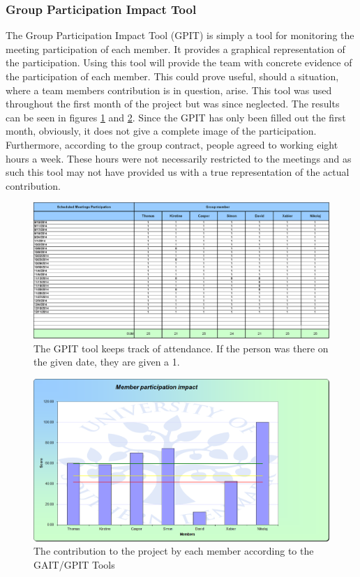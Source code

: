 \subsubsection{Group Participation Impact Tool}
The Group Participation Impact Tool (GPIT) is simply a tool for monitoring the meeting participation of each member. It provides a graphical representation of the participation. Using this tool will provide the team with concrete evidence of the participation of each member. This could prove useful, should a situation, where a team members contribution is in question, arise. This tool was used throughout the first month of the project but was since neglected. The results can be seen in figures \ref{fig:GPIT} and \ref{fig:GPITGraph}. Since the GPIT has only been filled out the first month, obviously, it does not give a complete image of the participation. Furthermore, according to the group contract, people agreed to working eight hours a week. These hours were not necessarily restricted to the meetings and as such this tool may not have provided us with a true representation of the actual contribution.


\begin{figure}[h!]
	\includegraphics[width=\textwidth]{./graphics/gpit_attendance}
	\caption[The GPIT tool]{The GPIT tool keeps track of attendance. If the person was there on the given date, they are given a 1.}
	\label{fig:GPIT}
\end{figure}

\begin{figure}[h!]
	\includegraphics[width=\textwidth]{./graphics/GPIT_impact}
	\caption[The contribution by each member]{The contribution to the project by each member according to the GAIT/GPIT Tools}
	\label{fig:GPITGraph}
\end{figure}